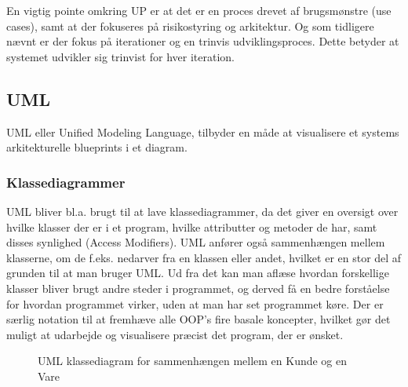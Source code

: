 En vigtig pointe omkring UP er at det er en proces drevet af brugsmønstre (use cases), samt at der fokuseres på risikostyring og arkitektur. Og som tidligere nævnt er der fokus på iterationer og en trinvis udviklingsproces. Dette betyder at systemet udvikler sig trinvist for hver iteration.


\subsection{UML}



UML eller Unified Modeling Language, tilbyder en måde at visualisere et systems arkitekturelle blueprints i et diagram. 





\subsubsection{Klassediagrammer}

UML bliver bl.a. brugt til at lave klassediagrammer, da det giver en oversigt over hvilke klasser der er i et program, hvilke attributter og metoder de har, samt disses synlighed (Access Modifiers). UML anfører også sammenhængen mellem klasserne, om de f.eks. nedarver fra en klassen eller andet, hvilket er en stor del af grunden til at man bruger UML.  Ud fra det kan man aflæse hvordan forskellige klasser bliver brugt andre steder i programmet, og derved få en bedre forståelse for hvordan programmet virker, uden at man har set programmet køre. Der er særlig notation til at fremhæve alle OOP's fire basale koncepter, hvilket gør det muligt at udarbejde og visualisere præcist det program, der er ønsket.

\begin{wrapfigure}{r}{0.30\textwidth}
    \vspace{0cm}
  \caption{UML klassediagram for sammenhængen mellem en Kunde og en Vare}
  \label{fig:UML eksempel}
\end{wrapfigure} 


